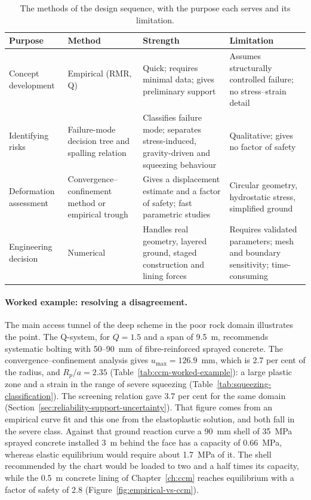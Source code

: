 \begin{table}[htbp]
\caption{The methods of the design sequence, with the purpose each serves and its limitation.}
\label{tab:method-selection}
\centering
\small
\begin{tabularx}{\textwidth}{l X X X}
\toprule
\textbf{Purpose} & \textbf{Method} & \textbf{Strength} & \textbf{Limitation} \\
\midrule
Concept development & Empirical (RMR, Q) & Quick; requires minimal data; gives preliminary support & Assumes structurally controlled failure; no stress--strain detail \\
Identifying risks & Failure-mode decision tree and spalling relation & Classifies failure mode; separates stress-induced, gravity-driven and squeezing behaviour & Qualitative; gives no factor of safety \\
Deformation assessment & Convergence--confinement method or empirical trough & Gives a displacement estimate and a factor of safety; fast parametric studies & Circular geometry, hydrostatic stress, simplified ground \\
Engineering decision & Numerical & Handles real geometry, layered ground, staged construction and lining forces & Requires validated parameters; mesh and boundary sensitivity; time-consuming \\
\bottomrule
\end{tabularx}
\end{table}

\paragraph{Worked example: resolving a disagreement.}
The main access tunnel of the deep scheme in the poor rock domain
illustrates the point. The Q-system, for $Q = 1.5$ and a span of 9.5~m,
recommends systematic bolting with 50--90~mm of fibre-reinforced sprayed concrete.
The convergence--confinement analysis gives $u_{\max} = 126.9$~mm, which is
2.7 per cent of the radius, and $R_p/a = 2.35$
(Table~\ref{tab:ccm-worked-example}): a large plastic zone and a strain in
the range of severe squeezing (Table~\ref{tab:squeezing-classification}).
The screening relation gave 3.7 per cent for the same domain
(Section~\ref{sec:reliability-support-uncertainty}). That figure comes from
an empirical curve fit and this one from the elastoplastic solution, and both
fall in the severe class.
Against that ground reaction curve a 90~mm shell of 35~MPa sprayed concrete
installed 3~m behind the face has a capacity of 0.66~MPa, whereas elastic
equilibrium would require about 1.7~MPa of it. The shell recommended by the
chart would be loaded to two and a half times its capacity, while the 0.5~m
concrete lining of Chapter~\ref{ch:ccm} reaches equilibrium with a factor of
safety of 2.8 (Figure~\ref{fig:empirical-vs-ccm}).

